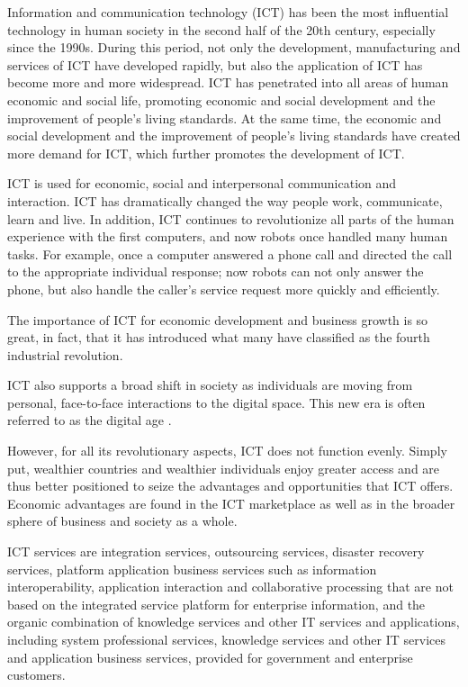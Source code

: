 \documentclass[a4paper,11pt]{article}
\begin{document}
Information and communication technology (ICT) has been the most influential technology in human society in the second half of the 20th century, especially since the 1990s. During this period, not only the development, manufacturing and services of ICT have developed rapidly, but also the application of ICT has become more and more widespread. ICT has penetrated into all areas of human economic and social life, promoting economic and social development and the improvement of people's living standards. At the same time, the economic and social development and the improvement of people's living standards have created more demand for ICT, which further promotes the development of ICT.

ICT is used for economic, social and interpersonal communication and interaction. ICT has dramatically changed the way people work, communicate, learn and live. In addition, ICT continues to revolutionize all parts of the human experience with the first computers, and now robots once handled many human tasks. For example, once a computer answered a phone call and directed the call to the appropriate individual response; now robots can not only answer the phone, but also handle the caller's service request more quickly and efficiently.

The importance of ICT for economic development and business growth is so great, in fact, that it has introduced what many have classified as the fourth industrial revolution.

ICT also supports a broad shift in society as individuals are moving from personal, face-to-face interactions to the digital space. This new era is often referred to as the digital age .

However, for all its revolutionary aspects, ICT does not function evenly\cite{ratheeswari2018information}. Simply put, wealthier countries and wealthier individuals enjoy greater access and are thus better positioned to seize the advantages and opportunities that ICT offers. Economic advantages are found in the ICT marketplace as well as in the broader sphere of business and society as a whole.

ICT services are integration services, outsourcing services, disaster recovery services, platform application business services such as information interoperability, application interaction and collaborative processing that are not based on the integrated service platform for enterprise information, and the organic combination of knowledge services and other IT services and applications, including system professional services, knowledge services and other IT services and application business services, provided for government and enterprise customers.
\end{document}
